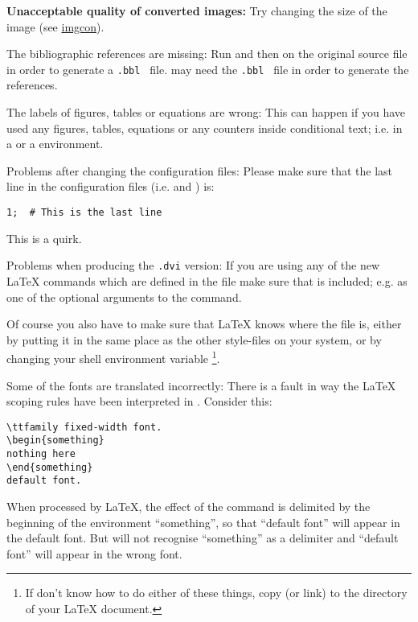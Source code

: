 \begin{htmllist}
\item [\textbf{Unacceptable quality of converted images: }]
Try changing the size of the image
(see \hyperref{image conversion}{Section~}{}{imgcon}).

\item [The bibliographic references are missing: ]
Run  and then  on the original source file in
order to generate a \texttt{.bbl } file.
\latextohtml{} may need the \texttt{.bbl } file in order to generate
the references.


\item [The labels of figures, tables or equations are wrong: ]
This can happen if you have used any figures, tables, equations or
any counters inside conditional text; i.e. in a 
or a  environment.


\item [Problems after changing the configuration files: ]
Please make sure that the last line in the configuration files
(i.e.  and ) is:
\begin{small}
\begin{verbatim}
1;	# This is the last line
\end{verbatim}
\end{small}
This is a \Perl{} quirk.

\item [Problems when producing the \texttt{.dvi} version: \label{htmlsty}]
If you are using any of the new \LaTeX{} commands which are defined in
the  file make sure that  is included;
e.g. as one of the optional arguments to the  command.

Of course you also have to make sure that \LaTeX{} knows where the 
file is, either by putting it in the same place as the other style-files on
your system, or by changing your  shell environment variable%
\footnote{If don't know how to do either of these things, copy (or link) 
to the directory of your \LaTeX{} document.}.

\item [Some of the fonts are translated incorrectly: ]
There is a fault in way the \LaTeX{} scoping rules have been
interpreted in \latextohtml. Consider this:
\begin{small}
\begin{verbatim}
\ttfamily fixed-width font.
\begin{something}
nothing here
\end{something}
default font.
\end{verbatim}
\end{small}
When processed by \LaTeX, the effect of the  command is
delimited by the beginning of the environment ``something'',
so that ``default font'' will appear in the default font.
But \latextohtml{} will not recognise
``something'' as a delimiter and ``default font'' will appear in the
wrong font.


\end{htmllist}
